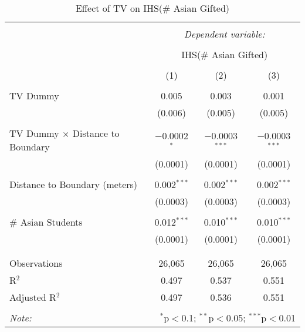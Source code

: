 
\begin{table}[!htbp] \centering 
  \caption{Effect of TV on IHS(\# Asian Gifted)} 
  \label{} 
\begin{tabular}{@{\extracolsep{-2pt}}lccc} 
\\[-1.8ex]\hline 
\hline \\[-1.8ex] 
 & \multicolumn{3}{c}{\textit{Dependent variable:}} \\ 
\cline{2-4} 
\\[-1.8ex] & \multicolumn{3}{c}{IHS(\# Asian Gifted)} \\ 
\\[-1.8ex] & (1) & (2) & (3)\\ 
\hline \\[-1.8ex] 
 TV Dummy & 0.005 & 0.003 & 0.001 \\ 
  & (0.006) & (0.005) & (0.005) \\ 
  & & & \\ 
 TV Dummy $\times$ Distance to Boundary & $-$0.0002$^{*}$ & $-$0.0003$^{***}$ & $-$0.0003$^{***}$ \\ 
  & (0.0001) & (0.0001) & (0.0001) \\ 
  & & & \\ 
 Distance to Boundary (meters) & 0.002$^{***}$ & 0.002$^{***}$ & 0.002$^{***}$ \\ 
  & (0.0003) & (0.0003) & (0.0003) \\ 
  & & & \\ 
 \# Asian Students & 0.012$^{***}$ & 0.010$^{***}$ & 0.010$^{***}$ \\ 
  & (0.0001) & (0.0001) & (0.0001) \\ 
  & & & \\ 
\hline \\[-1.8ex] 
Observations & 26,065 & 26,065 & 26,065 \\ 
R$^{2}$ & 0.497 & 0.537 & 0.551 \\ 
Adjusted R$^{2}$ & 0.497 & 0.536 & 0.551 \\ 
\hline 
\hline \\[-1.8ex] 
\textit{Note:}  & \multicolumn{3}{r}{$^{*}$p$<$0.1; $^{**}$p$<$0.05; $^{***}$p$<$0.01} \\ 
\end{tabular} 
\end{table} 
